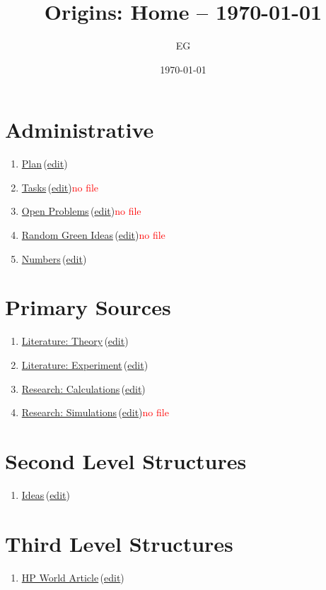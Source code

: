 \documentclass[12pt]{paper}
\title{Origins: Home -- \today}
\author{EG}
\date{\today}
\newcommand{\red}[1]{\textcolor{red}{#1}}
\newcommand{\wikilink}[2] { \href{#1.pdf}{#2}\,(\href{#1.tex}{edit})}
\begin{document}
 \maketitle
 \tableofcontents
 
\section{Administrative}


\begin{enumerate}
 \item \wikilink{plan}{Plan}
 \item \wikilink{tasks}{Tasks}\red{no file}
 \item \wikilink{open\_problems}{Open Problems}\red{no file}
 \item \wikilink{green\_ideas}{Random Green Ideas}\red{no file}
 \item \wikilink{numbers}{Numbers}
 
\end{enumerate}

\section{Primary Sources}
\begin{enumerate}
 \item \wikilink{literature\_theory}{Literature: Theory}
 \item \wikilink{literature\_experiment}{Literature: Experiment}
 \item \wikilink{research\_calculations}{Research: Calculations}
 \item \wikilink{research\_simulations}{Research: Simulations}\red{no file}
\end{enumerate}

\section{Second Level Structures}
\begin{enumerate}
 \item \wikilink{ideas}{Ideas}
\end{enumerate}

\section{Third Level Structures}


\begin{enumerate}
 \item \wikilink{hp\_world}{HP World Article}
\end{enumerate}




% 
% 

 
\end{document}
